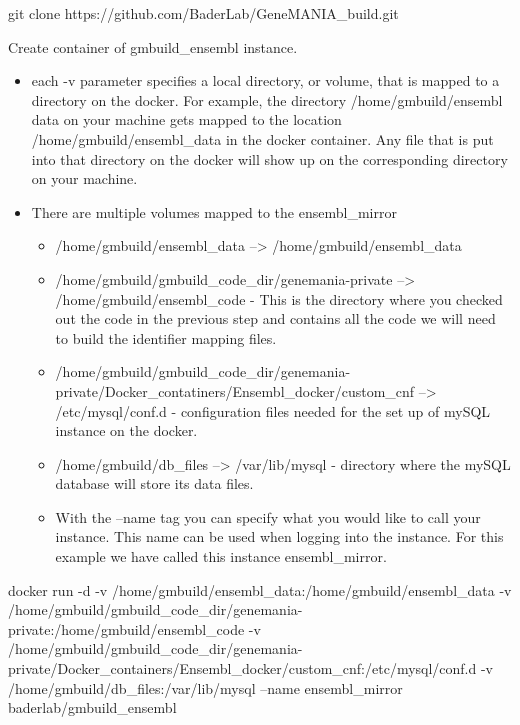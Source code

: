 \documentclass[]{book}
\newenvironment{Shaded}{\begin{snugshade}}{\end{snugshade}}
\newcommand{\FunctionTok}[1]{\textcolor[rgb]{0.00,0.00,0.00}{#1}}
\newcommand{\ExtensionTok}[1]{#1}
\newcommand{\NormalTok}[1]{#1}
\providecommand{\tightlist}{%
  \setlength{\itemsep}{0pt}\setlength{\parskip}{0pt}}
\begin{document}
\begin{Shaded}
\begin{Highlighting}[]
\FunctionTok{git}\NormalTok{ clone https://github.com/BaderLab/GeneMANIA_build.git}
\end{Highlighting}
\end{Shaded}

Create container of gmbuild\_ensembl instance.

\begin{itemize}
\tightlist
\item
  each -v parameter specifies a local directory, or volume, that is
  mapped to a directory on the docker. For example, the directory
  /home/gmbuild/ensembl data on your machine gets mapped to the location
  /home/gmbuild/ensembl\_data in the docker container. Any file that is
  put into that directory on the docker will show up on the
  corresponding directory on your machine.
\item
  There are multiple volumes mapped to the ensembl\_mirror

  \begin{itemize}
  \tightlist
  \item
    /home/gmbuild/ensembl\_data --\textgreater{}
    /home/gmbuild/ensembl\_data
  \item
    /home/gmbuild/gmbuild\_code\_dir/genemania-private --\textgreater{}
    /home/gmbuild/ensembl\_code - This is the directory where you
    checked out the code in the previous step and contains all the code
    we will need to build the identifier mapping files.
  \item
    /home/gmbuild/gmbuild\_code\_dir/genemania-private/Docker\_contatiners/Ensembl\_docker/custom\_cnf
    --\textgreater{} /etc/mysql/conf.d - configuration files needed for
    the set up of mySQL instance on the docker.
  \item
    /home/gmbuild/db\_files --\textgreater{} /var/lib/mysql - directory
    where the mySQL database will store its data files.
  \item
    With the --name tag you can specify what you would like to call your
    instance. This name can be used when logging into the instance. For
    this example we have called this instance ensembl\_mirror.
  \end{itemize}
\end{itemize}

\begin{Shaded}
\begin{Highlighting}[]
\ExtensionTok{docker}\NormalTok{ run -d}
\ExtensionTok{-v}\NormalTok{ /home/gmbuild/ensembl_data:/home/gmbuild/ensembl_data }
\ExtensionTok{-v}\NormalTok{ /home/gmbuild/gmbuild_code_dir/genemania-private:/home/gmbuild/ensembl_code }
\ExtensionTok{-v}\NormalTok{ /home/gmbuild/gmbuild_code_dir/genemania-private/Docker_containers/Ensembl_docker/custom_cnf:/etc/mysql/conf.d }
\ExtensionTok{-v}\NormalTok{ /home/gmbuild/db_files:/var/lib/mysql }
\ExtensionTok{--name}\NormalTok{ ensembl_mirror }
\ExtensionTok{baderlab/gmbuild_ensembl}
\end{Highlighting}
\end{Shaded}
\end{document}
